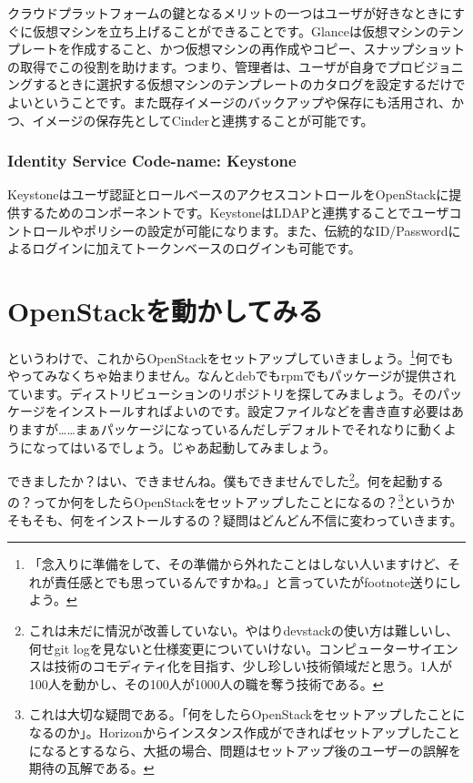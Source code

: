 \documentclass[9pt,b5paper,tombo,openany,dvipdfmx]{jsbook}
\begin{document}
クラウドプラットフォームの鍵となるメリットの一つはユーザが好きなときにすぐに仮想マシンを立ち上げることができることです。Glanceは仮想マシンのテンプレートを作成すること、かつ仮想マシンの再作成やコピー、スナップショットの取得でこの役割を助けます。つまり、管理者は、ユーザが自身でプロビジョニングするときに選択する仮想マシンのテンプレートのカタログを設定するだけでよいということです。また既存イメージのバックアップや保存にも活用され、かつ、イメージの保存先としてCinderと連携することが可能です。

\subsection{Identity Service Code-name: Keystone}

Keystoneはユーザ認証とロールベースのアクセスコントロールをOpenStackに提供するためのコンポーネントです。KeystoneはLDAPと連携することでユーザコントロールやポリシーの設定が可能になります。また、伝統的なID/Passwordによるログインに加えてトークンベースのログインも可能です。

\stopcontents[sections]

\chapter{OpenStackを動かしてみる}

\startcontents[sections]


というわけで、これからOpenStackをセットアップしていきましょう。\footnote{「念入りに準備をして、その準備から外れたことはしない人いますけど、それが責任感とでも思っているんですかね。」と言っていたがfootnote送りにしよう。}何でもやってみなくちゃ始まりません。なんとdebでもrpmでもパッケージが提供されています。ディストリビューションのリポジトリを探してみましょう。そのパッケージをインストールすればよいのです。設定ファイルなどを書き直す必要はありますが……まぁパッケージになっているんだしデフォルトでそれなりに動くようになってはいるでしょう。じゃあ起動してみましょう。

できましたか？はい、できませんね。僕もできませんでした\footnote{これは未だに情況が改善していない。やはりdevstackの使い方は難しいし、何せgit logを見ないと仕様変更についていけない。コンピューターサイエンスは技術のコモディティ化を目指す、少し珍しい技術領域だと思う。1人が100人を動かし、その100人が1000人の職を奪う技術である。}。何を起動するの？ってか何をしたらOpenStackをセットアップしたことになるの？\footnote{これは大切な疑問である。「何をしたらOpenStackをセットアップしたことになるのか」。Horizonからインスタンス作成ができればセットアップしたことになるとするなら、大抵の場合、問題はセットアップ後のユーザーの誤解を期待の瓦解である。}というかそもそも、何をインストールするの？疑問はどんどん不信に変わっていきます。
\end{document}
